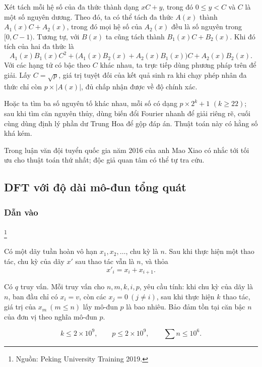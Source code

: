 \documentclass[11pt]{article}
\begin{document}
Xét tách mỗi hệ số của đa thức thành dạng \(xC+y\), trong đó \(0\le y<C\) và
\(C\) là một số nguyên dương. Theo đó, ta có thể tách đa thức \(A(x)\) thành
\(A_1(x)C+A_2(x)\), trong đó mọi hệ số của \(A_2(x)\) đều là số nguyên trong
\([0,C-1)\). Tương tự, với \(B(x)\) ta cũng tách thành \(B_1(x)C+B_2(x)\). Khi
đó tích của hai đa thức là
\[
A_1(x)B_1(x)C^2+\bigl(A_1(x)B_2(x)+A_2(x)B_1(x)\bigr)C+A_2(x)B_2(x).
\]
Với các hạng tử có bậc theo \(C\) khác nhau, ta trực tiếp dùng phương pháp trên
để giải. Lấy \(C=\sqrt p\), giá trị tuyệt đối của kết quả sinh ra khi chạy phép
nhân đa thức chỉ còn \(p\times |A(x)|\), đủ chấp nhận được về độ chính xác.

Hoặc ta tìm ba số nguyên tố khác nhau, mỗi số có dạng \(p\times 2^k+1\)
\((k\ge 22)\); sau khi tìm căn nguyên thủy, dùng biến đổi Fourier nhanh để giải
riêng rẽ, cuối cùng dùng định lý phần dư Trung Hoa để gộp đáp án. Thuật toán
này có hằng số khá kém.

Trong luận văn đội tuyển quốc gia năm 2016 của anh Mao Xiao có nhắc tới tối ưu
cho thuật toán thứ nhất; độc giả quan tâm có thể tự tra cứu.

\subsection{DFT với độ dài mô-đun tổng quát}

\subsubsection{Dẫn vào}

\paragraph{}\footnote{Nguồn: Peking University Training 2019.}

 Có một dãy tuần hoàn vô hạn
\(x_1,x_2,\ldots\), chu kỳ là \(n\). Sau khi thực hiện một thao tác, chu kỳ của
dãy \(x'\) sau thao tác vẫn là \(n\), và thỏa
\[
x'_i=x_i+x_{i+1}.
\]

Có \(q\) truy vấn. Mỗi truy vấn cho \(n,m,k,i,p\), yêu cầu tính: khi chu kỳ của
dãy là \(n\), ban đầu chỉ có \(x_i=v\), còn các \(x_j=0\ (j\ne i)\), sau khi
thực hiện \(k\) thao tác, giá trị của \(x_m\ (m\le n)\) lấy mô-đun \(p\) là
bao nhiêu. Bảo đảm tồn tại căn bậc \(n\) của đơn vị theo nghĩa mô-đun \(p\).

\[
k\le 2\times 10^9,\qquad p\le 2\times 10^9,\qquad \sum n\le 10^6.
\]
\end{document}

